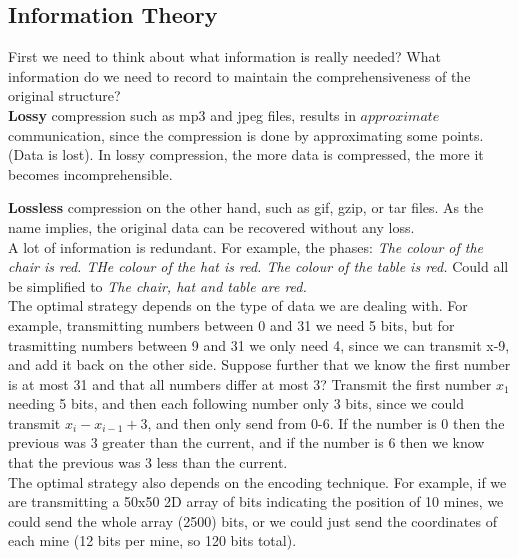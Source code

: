 \documentclass[12pt]{article}
\theoremstyle{definition}
\begin{document}
\subsection{Information Theory}
First we need to think about what information is really needed? What information do we need to record to maintain the comprehensiveness of the original structure?
\\ \linebreak
\textbf{Lossy} compression such as mp3 and jpeg files, results in $approximate$ communication, since the compression is done by approximating some points. (Data is lost). In lossy compression, the more data is compressed, the more it becomes incomprehensible.
\\ \linebreak

\textbf{Lossless} compression on the other hand, such as gif, gzip, or tar files. As the name implies, the original data can be recovered without any loss.
\\ \linebreak
A lot of information is redundant. For example, the phases: \textit{The colour of the chair is red. THe colour of the hat is red. The colour of the table is red.} Could all be simplified to \textit{The chair, hat and table are red.}
\\ \linebreak
The optimal strategy depends on the type of data we are dealing with. For example, transmitting numbers between 0 and 31 we need 5 bits, but for trasmitting numbers between 9 and 31 we only need 4, since we can transmit x-9, and add it back on the other side. Suppose further that we know the first number is at most 31 and that all numbers differ at most 3? Transmit the first number $x_1$ needing 5 bits, and then each following number only 3 bits, since we could transmit $x_i - x_{i-1} + 3$, and then only send from 0-6. If the number is 0 then the previous was 3 greater than the current, and if the number is 6 then we know that the previous was 3 less than the current.
\\ \linebreak
The optimal strategy also depends on the encoding technique. For example, if we are transmitting a 50x50 2D array of bits indicating the position of 10 mines, we could send the whole array (2500) bits, or we could just send the coordinates of each mine (12 bits per mine, so 120 bits total).
\end{document}
